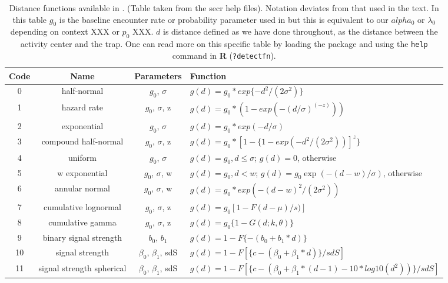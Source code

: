 \begin{table}
\centering
\caption{Distance functions available in \secr.  (Table taken from the secr
help files). Notation deviates from that used in the text.
In this table $g_{0}$ is the baseline encounter rate or probability
parameter used in \secr but this is equivalent to our $alpha_{0}$ or
$\lambda_{0}$ depending on context XXX or $p_0$ XXX. $d$ is distance defined as we have done throughout,
as the distance between the activity center and the trap.
One can read more on this specific table by loading the \secr package and using the
{\tt help} command in {\bf R} ({\tt?detectfn}).
}
\begin{tabular}{cccl}
\hline \hline
Code & Name & Parameters & Function  \\ \hline
0 & half-normal &$g_0$, $\sigma$          &  $g(d) = g_0 * exp\{-d^2 / (2  \sigma^2) \}$  \\
1 &hazard rate  & $g_0$, $\sigma$, z      &  $g(d) = g_0 * (1 - exp(- (d / \sigma) ^(-z) ))$ \\
2 &exponential   &$g_0$, $\sigma$    &  $g(d) = g_0 * exp(- d / \sigma)$ \\
3 &compound half-normal  & $g_0$, $\sigma$, z & $g(d) = g_0 * [1 - \{1 - exp(-d^2 / (2 \sigma^2))]^z\}$ \\
4 &uniform     & $g_0$, $\sigma$     &
\parbox[t]{2in}{ $g(d) = g_{0}, d \leq \sigma$; \\
                 $g(d)= 0$, otherwise
} \\
5 &w exponential            & $g_0$, $\sigma$, w &
\parbox[t]{2in}{ $g(d) = g_{0}, d < w$; \\
                 $g(d) = g_{0} \exp(- (d - w) / \sigma)$, otherwise
} \\
6 &annular normal           & $g_0$, $\sigma$, w & $g(d) = g_0 * exp(-(d-w)^2 / (2 \sigma^2))$ \\
7 &cumulative lognormal     & $g_0$, $\sigma$, z & $g(d) = g_0 [1 -F{(d-\mu)/s)}]$  \\
8 &cumulative gamma         & $g_0$, $\sigma$, z  & $g(d) = g_0 \{ 1 - G (d; k,  \theta) \}$  \\
9 &binary signal strength   & $b_0$, $b_1$       & $g(d) = 1 - F \{- (b_0 + b_1 * d) \}$ \\
10&signal strength          & $\beta_0$, $\beta_1$, sdS  &
  $g(d) = 1 - F[ \{c - (\beta_0 + \beta_1 * d)\} / sdS]$  \\
11&signal strength spherical&  $\beta_0$, $\beta_1$, sdS & 
\parbox[t]{2in}{ $g(d) = 1 - F[\{c - (\beta_0 + \beta_1 * (d-1)- 10 * log10 ( d^2 ) ) \} / sdS ]$ 
} \\

\end{tabular}
\label{covariates.tab.detmodels}
\end{table}

